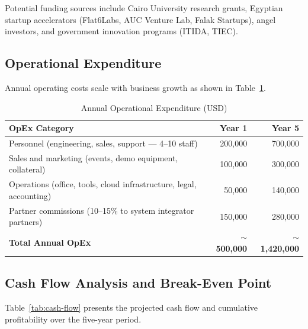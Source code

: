 Potential funding sources include Cairo University research grants, Egyptian startup accelerators (Flat6Labs, AUC Venture Lab, Falak Startups), angel investors, and government innovation programs (ITIDA, TIEC).

\subsection{Operational Expenditure}

Annual operating costs scale with business growth as shown in Table~\ref{tab:opex}.

\begin{table}[htbp]
\centering
\caption{Annual Operational Expenditure (USD)}
\label{tab:opex}
\begin{tabular}{|l|r|r|}
\hline
\textbf{OpEx Category} & \textbf{Year 1} & \textbf{Year 5} \\
\hline
Personnel (engineering, sales, support — 4--10 staff) & 200,000 & 700,000 \\
Sales and marketing (events, demo equipment, collateral) & 100,000 & 300,000 \\
Operations (office, tools, cloud infrastructure, legal, accounting) & 50,000 & 140,000 \\
Partner commissions (10--15\% to system integrator partners) & 150,000 & 280,000 \\
\hline
\textbf{Total Annual OpEx} & \textbf{$\sim$500,000} & \textbf{$\sim$1,420,000} \\
\hline
\end{tabular}
\end{table}

\subsection{Cash Flow Analysis and Break-Even Point}

Table~\ref{tab:cash-flow} presents the projected cash flow and cumulative profitability over the five-year period.

